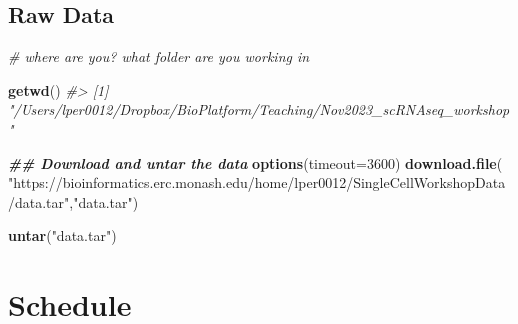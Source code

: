 \documentclass[
]{book}
\newenvironment{Shaded}{\begin{snugshade}}{\end{snugshade}}
\newcommand{\AttributeTok}[1]{\textcolor[rgb]{0.13,0.29,0.53}{#1}}
\newcommand{\CommentTok}[1]{\textcolor[rgb]{0.56,0.35,0.01}{\textit{#1}}}
\newcommand{\DecValTok}[1]{\textcolor[rgb]{0.00,0.00,0.81}{#1}}
\newcommand{\DocumentationTok}[1]{\textcolor[rgb]{0.56,0.35,0.01}{\textbf{\textit{#1}}}}
\newcommand{\FunctionTok}[1]{\textcolor[rgb]{0.13,0.29,0.53}{\textbf{#1}}}
\newcommand{\NormalTok}[1]{#1}
\newcommand{\StringTok}[1]{\textcolor[rgb]{0.31,0.60,0.02}{#1}}
\begin{document}
\hypertarget{raw-data}{%
\section{Raw Data}\label{raw-data}}

\begin{Shaded}
\begin{Highlighting}[]
\CommentTok{\# where are you? what folder are you working in}

\FunctionTok{getwd}\NormalTok{()}
\CommentTok{\#\textgreater{} [1] "/Users/lper0012/Dropbox/BioPlatform/Teaching/Nov2023\_scRNAseq\_workshop"}

\DocumentationTok{\#\# Download and untar the data}
\FunctionTok{options}\NormalTok{(}\AttributeTok{timeout=}\DecValTok{3600}\NormalTok{)}
\FunctionTok{download.file}\NormalTok{(}
    \StringTok{"https://bioinformatics.erc.monash.edu/home/lper0012/SingleCellWorkshopData/data.tar"}\NormalTok{,}\StringTok{"data.tar"}\NormalTok{)}

\FunctionTok{untar}\NormalTok{(}\StringTok{"data.tar"}\NormalTok{)}
\end{Highlighting}
\end{Shaded}

\hypertarget{schedule}{%
\chapter{Schedule}\label{schedule}}
\end{document}
